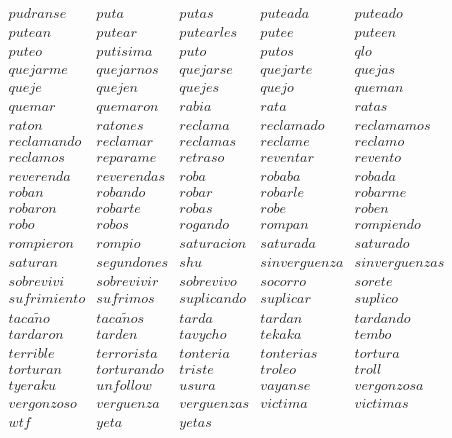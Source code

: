 \noindent
$
\begin{array}{ccccc}
pudranse & puta & putas & puteada & puteado \\
putean & putear & putearles & putee & puteen \\
puteo & putisima & puto & putos & qlo \\
quejarme & quejarnos & quejarse & quejarte & quejas \\
queje & quejen & quejes & quejo & queman \\
quemar & quemaron & rabia & rata & ratas \\
raton & ratones & reclama & reclamado & reclamamos \\
reclamando & reclamar & reclamas & reclame & reclamo \\
reclamos & reparame & retraso & reventar & revento \\
reverenda & reverendas & roba & robaba & robada \\
roban & robando & robar & robarle & robarme \\
robaron & robarte & robas & robe & roben \\
robo & robos & rogando & rompan & rompiendo \\
rompieron & rompio & saturacion & saturada & saturado \\
saturan & segundones & shu & sinverguenza & sinverguenzas \\
sobrevivi & sobrevivir & sobrevivo & socorro & sorete \\
sufrimiento & sufrimos & suplicando & suplicar & suplico \\
taca\tilde{n}o & taca\tilde{n}os & tarda & tardan & tardando \\
tardaron & tarden & tavycho & tekaka & tembo \\
terrible & terrorista & tonteria & tonterias & tortura \\
torturan & torturando & triste & troleo & troll \\
tyeraku & unfollow & usura & vayanse & vergonzosa \\
vergonzoso & verguenza & verguenzas & victima & victimas \\
wtf & yeta & yetas & & \\
\end{array}
$

